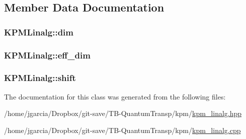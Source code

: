 \subsection{Member Data Documentation}
\hypertarget{classKPMLinalg_a827e818eefc60d764fc5ab37dc8c5c15}{
\subsubsection[{dim}]{ K\+P\+M\+Linalg\+::dim\hspace{0.3cm}{\ttfamily [private]}}}\label{classKPMLinalg_a827e818eefc60d764fc5ab37dc8c5c15}
\hypertarget{classKPMLinalg_a000e78c76f8988c9df5659f8e28817ed}{
\subsubsection[{eff\+\_\+dim}]{ K\+P\+M\+Linalg\+::eff\+\_\+dim\hspace{0.3cm}{\ttfamily [private]}}}\label{classKPMLinalg_a000e78c76f8988c9df5659f8e28817ed}
\hypertarget{classKPMLinalg_a5cd6b3a04889819907467b1ca6d91ffd}{
\subsubsection[{shift}]{ K\+P\+M\+Linalg\+::shift\hspace{0.3cm}{\ttfamily [private]}}}\label{classKPMLinalg_a5cd6b3a04889819907467b1ca6d91ffd}


The documentation for this class was generated from the following files\+:\begin{DoxyCompactItemize}
\item 
/home/jgarcia/\+Dropbox/git-\/save/\+T\+B-\/\+Quantum\+Transp/kpm/\hyperlink{kpm__linalg_8hpp}{kpm\+\_\+linalg.\+hpp}\item 
/home/jgarcia/\+Dropbox/git-\/save/\+T\+B-\/\+Quantum\+Transp/kpm/\hyperlink{kpm__linalg_8cpp}{kpm\+\_\+linalg.\+cpp}\end{DoxyCompactItemize}
